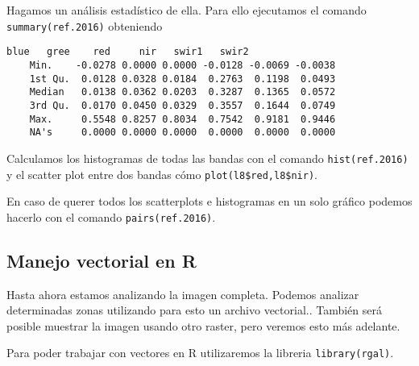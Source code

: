 \begin{exa}

    Hagamos un an\'alisis estad\'istico de ella. Para ello ejecutamos el
    comando \texttt{summary(ref.2016)} obteniendo
    \begin{Verbatim}[fontsize=\small]
               blue   gree    red     nir   swir1   swir2
    Min.    -0.0278 0.0000 0.0000 -0.0128 -0.0069 -0.0038
    1st Qu.  0.0128 0.0328 0.0184  0.2763  0.1198  0.0493
    Median   0.0138 0.0362 0.0203  0.3287  0.1365  0.0572
    3rd Qu.  0.0170 0.0450 0.0329  0.3557  0.1644  0.0749
    Max.     0.5548 0.8257 0.8034  0.7542  0.9181  0.9446
    NA's     0.0000 0.0000 0.0000  0.0000  0.0000  0.0000
    \end{Verbatim}
    Calculamos los histogramas de todas las bandas con el
    comando \texttt{hist(ref.2016)} y el scatter plot entre dos bandas c\'omo
  \verb|plot(l8$red,l8$nir)|.

    En caso de querer todos los scatterplots e histogramas en un solo gr\'afico
    podemos hacerlo con el comando \texttt{pairs(ref.2016)}.
    \end{exa}


\subsection{Manejo vectorial en R}

Hasta ahora estamos analizando la imagen completa. Podemos analizar
determinadas zonas utilizando para esto un archivo vectorial.. Tambi\'en ser\'a
posible muestrar la imagen usando otro raster, pero veremos esto m\'as adelante.

Para poder trabajar con vectores en R utilizaremos la libreria
\texttt{library(rgal)}.

